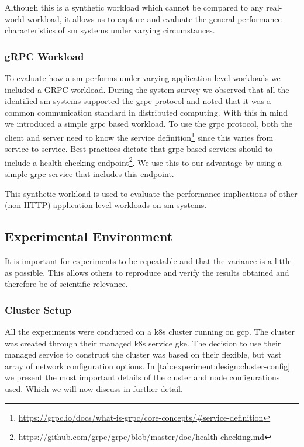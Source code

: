 Although this is a synthetic workload which cannot be compared to any real-world workload, it allows us to capture and evaluate the general performance characteristics of \gls{sm} systems under varying circumstances.

\subsubsection{gRPC Workload}
\label{sec:experiments:design:workloads:grpc}

To evaluate how a \gls{sm} performs under varying application level workloads we included a GRPC workload. During the system survey we observed that all the identified \gls{sm} systems supported the \gls{grpc} protocol and noted that it was a common communication standard in distributed computing. With this in mind we introduced a simple \gls{grpc} based workload. To use the \gls{grpc} protocol, both the client and server need to know the service definition\footnote{\url{https://grpc.io/docs/what-is-grpc/core-concepts/\#service-definition}} since this varies from service to service. Best practices dictate that \gls{grpc} based services should to include a health checking endpoint\footnote{\url{https://github.com/grpc/grpc/blob/master/doc/health-checking.md}}. We use this to our advantage by using a simple \gls{grpc} service that includes this endpoint.

This synthetic workload is used to evaluate the performance implications of other (non-HTTP) application level workloads on \gls{sm} systems.

\subsection{Experimental Environment}
\label{sec:experiments:design:environment}

It is important for experiments to be repeatable and that the variance is a little as possible. This allows others to reproduce and verify the results obtained and therefore be of scientific relevance. 

\subsubsection{Cluster Setup}
\label{sec:experiments:design:environment:cluster}

All the experiments were conducted on a \gls{k8s} cluster running on \gls{gcp}. The cluster was created through their managed \gls{k8s} service \gls{gke}. The decision to use their managed service to construct the cluster was based on their flexible, but vast array of network configuration options. In \cref{tab:experiment:design:cluster-config} we present the most important details of the cluster and node configurations used. Which we will now discuss in further detail.

